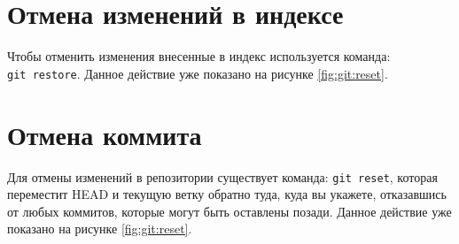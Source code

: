 \section{Отмена изменений в индексе}
Чтобы отменить изменения внесенные в индекс используется
команда: \texttt{git~restore}.
Данное действие уже показано на рисунке \ref{fig:git:reset}.

\section{Отмена коммита}
Для отмены изменений в репозитории существует команда: \texttt{git~reset},
которая переместит HEAD и текущую ветку обратно туда, куда вы укажете,
отказавшись от любых коммитов, которые могут быть оставлены позади.
Данное действие уже показано на рисунке \ref{fig:git:reset}.
